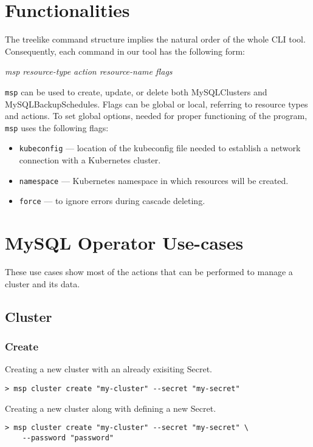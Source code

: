 \section{Functionalities}
The treelike command structure implies the natural order of the whole CLI
tool. Consequently, each command in our tool has the following form: \\
\centerline{\textit{msp resource-type action resource-name flags}}
\texttt{msp} can be used to create, update, or delete both MySQLClusters
and MySQLBackupSchedules. Flags can be global or local, referring
to resource types and actions. To set global options, needed for proper
functioning of the program, \texttt{msp} uses the following flags:
\begin{itemize}
    \item \texttt{kubeconfig} --- location of the kubeconfig file needed to
        establish a network connection with a Kubernetes cluster.
    \item \texttt{namespace} --- Kubernetes namespace in which resources will be created.
    \item \texttt{force} --- to ignore errors during cascade deleting.
\end{itemize}


\section{MySQL Operator Use-cases}

These use cases show most of the actions that can be performed to manage a cluster and its data.

\subsection{Cluster}

\subsubsection*{Create}
\noindent Creating a new cluster with an already exisiting Secret.

\begin{lstlisting}
> msp cluster create "my-cluster" --secret "my-secret"
\end{lstlisting}

\noindent Creating a new cluster along with defining a new Secret.

\begin{lstlisting}
> msp cluster create "my-cluster" --secret "my-secret" \
	--password "password"
\end{lstlisting}

